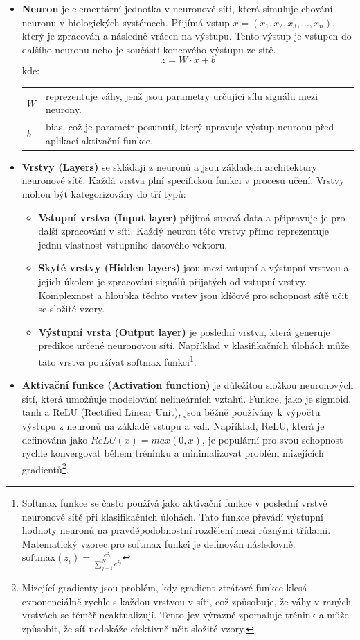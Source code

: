 \documentclass[male,czech,api_ing]{thesis}
\makeatletter
\newenvironment{conditions}[1][kde:]
    {#1 \begin{tabular}[t]{>{$}l<{$} @{${}={}$} >{\raggedright\arraybackslash}p{10cm}}}
    {\end{tabular}}
\makeatother
\begin{document}
\begin{itemize}
    \item \textbf{Neuron} je elementární jednotka v neuronové síti, která simuluje chování neuronu v biologických systémech. Přijímá vstup $x = (x_1, x_2, x_3, ..., x_n)$, který je zpracován a následně vrácen na výstupu. Tento výstup je vstupen do dalšího neuronu nebo je součástí koncového výstupu ze sítě.
        \begin{equation}
            z = W \cdot x + b
        \end{equation}
        \begin{conditions}
            W & reprezentuje váhy, jenž jsou parametry určující sílu signálu mezi neurony. \\
            b & bias, což je parametr posunutí, který upravuje výstup neuronu před aplikací aktivační funkce.
        \end{conditions}
    \item \textbf{Vrstvy (Layers)} se skládají z neuronů a jsou základem architektury neuronové sítě. Každá vrstva plní specifickou funkci v procesu učení. Vrstvy mohou být kategorizovány do tří typů:
        \begin{itemize}
            \item \textbf{Vstupní vrstva (Input layer)} přijímá surová data a připravuje je pro další zpracování v síti. Každý neuron této vrstvy přímo reprezentuje jednu vlastnost vstupního datového vektoru.
            \item \textbf{Skyté vrstvy (Hidden layers)} jsou mezi vstupní a výstupní vrstvou a jejich úkolem je zpracování signálů přijatých od vstupní vrstvy. Komplexnost a hloubka těchto vrstev jsou klíčové pro schopnost sítě učit se složité vzory.
            \item \textbf{Výstupní vrsta (Output layer) } je poslední vrstva, která generuje predikce určené neuronovou sítí. Například v klasifikačních úlohách může tato vrstva používat softmax funkci\footnote{Softmax funkce se často používá jako aktivační funkce v poslední vrstvě neuronové sítě při klasifikačních úlohách. Tato funkce převádí výstupní hodnoty neuronů na pravděpodobnostní rozdělení mezi různými třídami. Matematický vzorec pro softmax funkci je definován následovně: $\text{softmax}(z_i) = \frac{e^{z_i}}{\sum_{j=1}^{N} e^{z_j}}$}.
        \end{itemize}
    \item \textbf{Aktivační funkce (Activation function)} je důležitou složkou neuronových sítí, která umožňuje modelování nelineárních vztahů. Funkce, jako je sigmoid, tanh a ReLU (Rectified Linear Unit), jsou běžně používány k výpočtu výstupu z neuronů na základě vstupu a vah. Například, ReLU, která je definována jako $ReLU(x) = max(0, x)$, je populární pro svou schopnost rychle konvergovat během tréninku a minimalizovat problém mizejících gradientů\footnote{Mizející gradienty jsou problém, kdy gradient ztrátové funkce klesá exponenciálně rychle s každou vrstvou v síti, což způsobuje, že váhy v raných vrstvách se téměř neaktualizují. Tento jev výrazně zpomaluje trénink a může způsobit, že síť nedokáže efektivně učit složité vzory.}.

\end{itemize}
\end{document}
